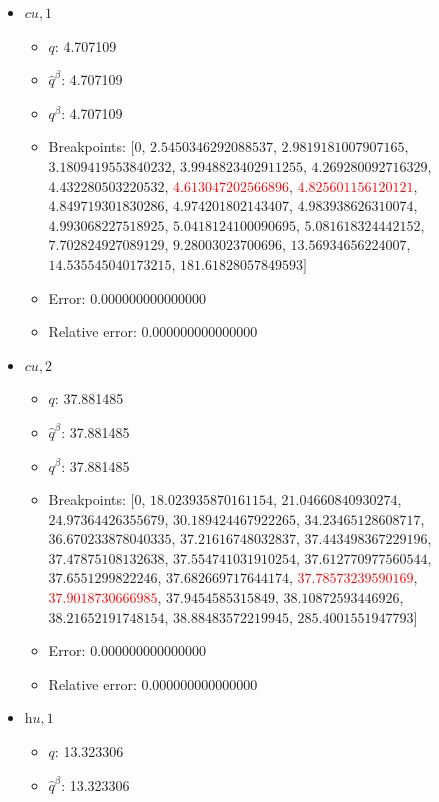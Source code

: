 \documentclass{article}%
\begin{document}
\begin{itemize}
\begin{itemize}
		\item Error: 0.000000000000000%
		\item Relative error: 0.000000000000000%
	\end{itemize}%
	\item $\textit{cu},1$%
	\begin{itemize}%
		\item $q$: 4.707109%
		\item $\hat{q}^\beta$: 4.707109%
		\item $q^\beta$: 4.707109%
		\item Breakpoints: $[$$0$, $2.5450346292088537$, $2.9819181007907165$, $3.1809419553840232$, $3.9948823402911255$, $4.269280092716329$, $4.432280503220532$, \textcolor{red}{$4.613047202566896$}, \textcolor{red}{$4.825601156120121$}, $4.849719301830286$, $4.974201802143407$, $4.983938626310074$, $4.993068227518925$, $5.0418124100090695$, $5.081618324442152$, $7.702824927089129$, $9.28003023700696$, $13.56934656224007$, $14.535545040173215$, $181.61828057849593$$]$%
		\item Error: 0.000000000000000%
		\item Relative error: 0.000000000000000%
	\end{itemize}%
	\item $\textit{cu},2$%
	\begin{itemize}%
		\item $q$: 37.881485%
		\item $\hat{q}^\beta$: 37.881485%
		\item $q^\beta$: 37.881485%
		\item Breakpoints: $[$$0$, $18.023935870161154$, $21.04660840930274$, $24.97364426355679$, $30.189424467922265$, $34.23465128608717$, $36.670233878040335$, $37.21616748032837$, $37.443498367229196$, $37.47875108132638$, $37.554741031910254$, $37.612770977560544$, $37.6551299822246$, $37.682669717644174$, \textcolor{red}{$37.78573239590169$}, \textcolor{red}{$37.9018730666985$}, $37.9454585315849$, $38.10872593446926$, $38.21652191748154$, $38.88483572219945$, $285.4001551947793$$]$%
		\item Error: 0.000000000000000%
		\item Relative error: 0.000000000000000%
	\end{itemize}%
	\item $\textit{hu},1$%
	\begin{itemize}%
		\item $q$: 13.323306%
		\item $\hat{q}^\beta$: 13.323306%

\end{itemize}
\end{itemize}
\end{document}
